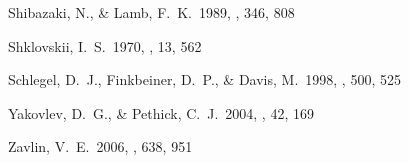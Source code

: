 \documentclass[iop]{emulateapj}
\begin{document}
\begin{thebibliography}{}
 Shibazaki, N., \& Lamb, F.~K.\ 1989, \apj, 346, 808 

 Shklovskii, I.~S.\ 1970, \sovast, 13, 562 

 Schlegel, D.~J., Finkbeiner, D.~P., \& Davis, M.\ 1998, \apj, 500, 525 

 Yakovlev, D.~G., \& Pethick, C.~J.\ 2004, \araa, 42, 169 

 Zavlin, V.~E.\ 2006, \apj, 638, 951 


\end{thebibliography}
\end{document}
